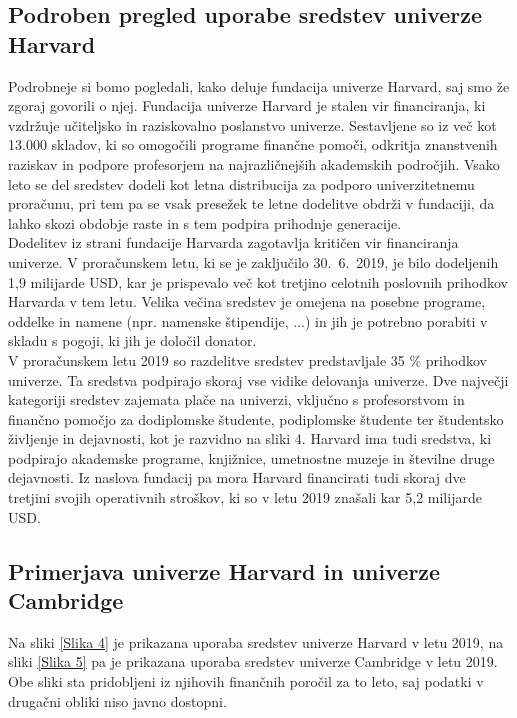 \documentclass[12pt, a4paper]{article}
\begin{document}
\subsection{Podroben pregled uporabe sredstev univerze Harvard}

Podrobneje si bomo pogledali, kako deluje fundacija univerze Harvard, saj smo že zgoraj govorili o njej. Fundacija univerze Harvard je stalen vir financiranja, ki vzdržuje učiteljsko in raziskovalno poslanstvo univerze. Sestavljene so iz več kot 13.000 skladov, ki so omogočili programe finančne pomoči, odkritja znanstvenih raziskav in podpore profesorjem na najrazličnejših akademskih področjih. Vsako leto se del sredstev dodeli kot letna distribucija za podporo univerzitetnemu proračunu, pri tem pa se vsak presežek te letne dodelitve obdrži v fundaciji, da  lahko skozi obdobje raste in s tem podpira prihodnje generacije. \cite{harvard} \\

Dodelitev iz strani fundacije Harvarda zagotavlja kritičen vir financiranja univerze. V proračunskem letu, ki se je zaključilo 30.~6.~2019, je bilo dodeljenih 1,9 milijarde USD, kar je prispevalo več kot tretjino celotnih poslovnih prihodkov Harvarda v tem letu. Velika večina sredstev je omejena na posebne programe, oddelke in namene (npr. namenske štipendije, ...) in jih je potrebno porabiti v skladu s pogoji, ki jih je določil donator. \cite{harvard} \\

V proračunskem letu 2019 so razdelitve sredstev predstavljale 35 \% prihodkov univerze. Ta sredstva podpirajo skoraj vse vidike delovanja univerze. Dve največji kategoriji sredstev zajemata plače na univerzi, vključno s profesorstvom in finančno pomočjo za dodiplomske študente, podiplomske študente ter študentsko življenje in dejavnosti, kot je razvidno na sliki 4. Harvard ima tudi sredstva, ki podpirajo akademske programe, knjižnice, umetnostne muzeje in številne druge dejavnosti. Iz naslova fundacij pa mora Harvard financirati tudi skoraj dve tretjini svojih operativnih stroškov, ki so v letu 2019 znašali kar 5,2 milijarde USD. \cite{harvard} 

\subsection{Primerjava univerze Harvard in univerze Cambridge}

Na sliki \ref{Slika 4} je prikazana uporaba sredstev univerze Harvard v letu 2019, na sliki \ref{Slika 5} pa je prikazana uporaba sredstev univerze Cambridge v letu 2019. Obe sliki sta pridobljeni iz njihovih finančnih poročil za to leto, saj podatki v drugačni obliki niso javno dostopni. \\
\end{document}
